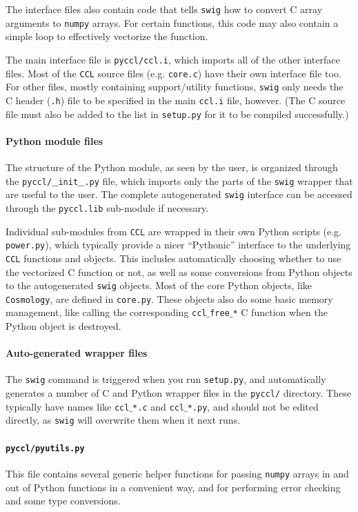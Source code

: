 \documentclass[\docopts]{\docclass}
\newcommand{\ccl}{{\tt CCL}\xspace}
\begin{document}
The interface files also contain code that tells {\tt swig} how to convert C array arguments to {\tt numpy} arrays. For certain functions, this code may also contain a simple loop to effectively vectorize the function.

The main interface file is {\tt pyccl/ccl.i}, which imports all of the other interface files. Most of the \ccl source files (e.g. {\tt core.c}) have their own interface file too. For other files, mostly containing support/utility functions, {\tt swig} only needs the C header ({\tt .h}) file to be specified in the main {\tt ccl.i} file, however. (The C source file must also be added to the list in {\tt setup.py} for it to be compiled successfully.)

\paragraph{Python module files} The structure of the Python module, as seen by the user, is organized through the {\tt pyccl/$\_$$\_$init$\_$$\_$.py} file, which imports only the parts of the {\tt swig} wrapper that are useful to the user. The complete autogenerated {\tt swig} interface can be accessed through the {\tt pyccl.lib} sub-module if necessary.

Individual sub-modules from \ccl are wrapped in their own Python scripts (e.g. {\tt power.py}), which typically provide a nicer ``Pythonic'' interface to the underlying \ccl functions and objects. This includes automatically choosing whether to use the vectorized C function or not, as well as some conversions from Python objects to the autogenerated {\tt swig} objects. Most of the core Python objects, like {\tt Cosmology}, are defined in {\tt core.py}. These objects also do some basic memory management, like calling the corresponding {\tt ccl$\_$free$\_$*} C function when the Python object is destroyed.

\paragraph{Auto-generated wrapper files} The {\tt swig} command is triggered when you run {\tt setup.py}, and automatically generates a number of C and Python wrapper files in the {\tt pyccl/} directory. These typically have names like {\tt ccl$\_$*.c} and {\tt ccl$\_$*.py}, and should not be edited directly, as {\tt swig} will overwrite them when it next runs.

\paragraph{{\tt pyccl/pyutils.py}} This file contains several generic helper functions for passing {\tt numpy} arrays in and out of Python functions in a convenient way, and for performing error checking and some type conversions.
\end{document}
